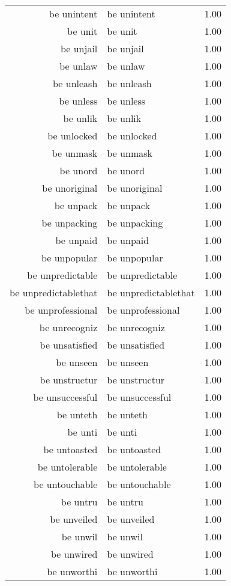 \begin{table}[ht]
\begin{tabular}{rlr}
  be unintent & be unintent & 1.00 \\ 
  be unit & be unit & 1.00 \\ 
  be unjail & be unjail & 1.00 \\ 
  be unlaw & be unlaw & 1.00 \\ 
  be unleash & be unleash & 1.00 \\ 
  be unless & be unless & 1.00 \\ 
  be unlik & be unlik & 1.00 \\ 
  be unlocked & be unlocked & 1.00 \\ 
  be unmask & be unmask & 1.00 \\ 
  be unord & be unord & 1.00 \\ 
  be unoriginal & be unoriginal & 1.00 \\ 
  be unpack & be unpack & 1.00 \\ 
  be unpacking & be unpacking & 1.00 \\ 
  be unpaid & be unpaid & 1.00 \\ 
  be unpopular & be unpopular & 1.00 \\ 
  be unpredictable & be unpredictable & 1.00 \\ 
  be unpredictablethat & be unpredictablethat & 1.00 \\ 
  be unprofessional & be unprofessional & 1.00 \\ 
  be unrecogniz & be unrecogniz & 1.00 \\ 
  be unsatisfied & be unsatisfied & 1.00 \\ 
  be unseen & be unseen & 1.00 \\ 
  be unstructur & be unstructur & 1.00 \\ 
  be unsuccessful & be unsuccessful & 1.00 \\ 
  be unteth & be unteth & 1.00 \\ 
  be unti & be unti & 1.00 \\ 
  be untoasted & be untoasted & 1.00 \\ 
  be untolerable & be untolerable & 1.00 \\ 
  be untouchable & be untouchable & 1.00 \\ 
  be untru & be untru & 1.00 \\ 
  be unveiled & be unveiled & 1.00 \\ 
  be unwil & be unwil & 1.00 \\ 
  be unwired & be unwired & 1.00 \\ 
  be unworthi & be unworthi & 1.00 \\ 

\end{tabular}
\end{table}
